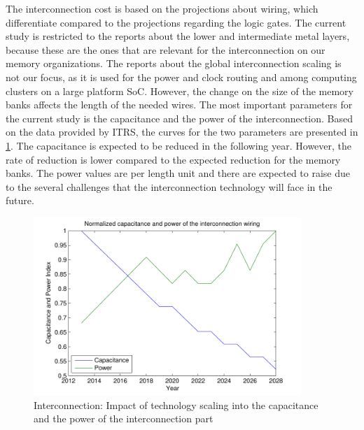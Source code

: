 The interconnection cost is based on the projections about wiring, which differentiate compared to the projections regarding the logic gates.
The current study is restricted to the reports about the lower and intermediate metal layers, because these are the ones that are relevant for the interconnection on our memory organizations.
The reports about the global interconnection scaling is not our focus, as it is used for the power and clock routing and among computing clusters on a large platform SoC.
However, the change on the size of the memory banks affects the length of the needed wires.
The most important parameters for the current study is the capacitance and the power of the interconnection.
Based on the data provided by ITRS, the curves for the two parameters are presented in \ref{fig:intpowerE}.
The capacitance is expected to be reduced in the following year.
However, the rate of reduction is lower compared to the expected reduction for the memory banks.
The power values are per length unit and there are expected to raise due to the several challenges that the interconnection technology will face in the future.

 \begin{figure}
 \centering
 \includegraphics[width =0.9\textwidth]{E/intpower.pdf}
  \caption{Interconnection: Impact of technology scaling into the capacitance and the power of the interconnection part}
 \label{fig:intpowerE}
 \end{figure}

